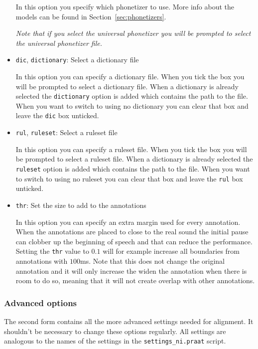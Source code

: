\begin{itemize}
		In this option you specify which phonetizer to use. More info about the
		models can be found in Section~\ref{sec:phonetizers}.

		\emph{Note that if you select the universal phonetizer you will be prompted
		to select the universal phonetizer file.}
	\item \texttt{dic}, \texttt{dictionary}: %
		Select a dictionary file

		In this option you can specify a dictionary file. When you tick the box you
		will be prompted to select a dictionary file. When a dictionary is already
		selected the \texttt{dictionary} option is added which contains the path to
		the file. When you want to switch to using no dictionary you can clear that
		box and leave the \texttt{dic} box unticked.
	\item \texttt{rul}, \texttt{ruleset}: %
		Select a ruleset file

		In this option you can specify a ruleset file. When you tick the box you
		will be prompted to select a ruleset file. When a dictionary is already
		selected the \texttt{ruleset} option is added which contains the path to
		the file. When you want to switch to using no ruleset you can clear that
		box and leave the \texttt{rul} box unticked.
	\item \texttt{thr}: %
		Set the size to add to the annotations

		In this option you can specify an extra margin used for every annotation.
		When the annotations are placed to close to the real sound the initial
		pause can clobber up the beginning of speech and that can reduce the
		performance. Setting the \texttt{thr} value to $0.1$ will for example increase
		all boundaries from annotations with $100$ms. Note that this does not
		change the original annotation and it will only increase the widen the
		annotation when there is room to do so, meaning that it will not create
		overlap with other annotations.
\end{itemize}

\subsubsection{Advanced options}	
The second form contains all the more advanced settings needed for alignment.
It shouldn't be necessary to change these options regularly. All settings are
analogous to the names of the settings in the \texttt{settings\_ni.praat}
script.

